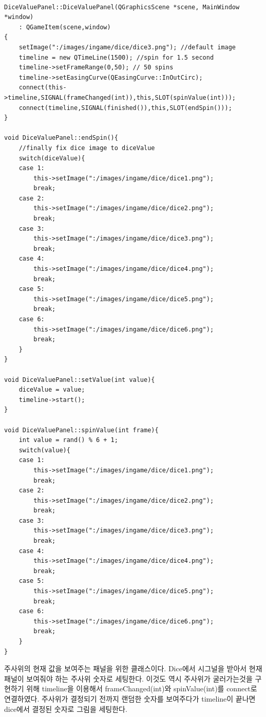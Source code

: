 \documentclass[10pt,oneside,a4paper,titlepage]{article}
\begin{document}
\begin{lstlisting}[frame=single,caption=
{DiceValuePanel},label=code:FD,captionpos=b,framexleftmargin=10pt,escapeinside=~~]

DiceValuePanel::DiceValuePanel(QGraphicsScene *scene, MainWindow *window)
    : QGameItem(scene,window)
{
    setImage(":/images/ingame/dice/dice3.png"); //default image
    timeline = new QTimeLine(1500); //spin for 1.5 second
    timeline->setFrameRange(0,50); // 50 spins
    timeline->setEasingCurve(QEasingCurve::InOutCirc);
    connect(this->timeline,SIGNAL(frameChanged(int)),this,SLOT(spinValue(int)));
    connect(timeline,SIGNAL(finished()),this,SLOT(endSpin()));
}

void DiceValuePanel::endSpin(){
    //finally fix dice image to diceValue
    switch(diceValue){
    case 1:
        this->setImage(":/images/ingame/dice/dice1.png");
        break;
    case 2:
        this->setImage(":/images/ingame/dice/dice2.png");
        break;
    case 3:
        this->setImage(":/images/ingame/dice/dice3.png");
        break;
    case 4:
        this->setImage(":/images/ingame/dice/dice4.png");
        break;
    case 5:
        this->setImage(":/images/ingame/dice/dice5.png");
        break;
    case 6:
        this->setImage(":/images/ingame/dice/dice6.png");
        break;
    }
}

void DiceValuePanel::setValue(int value){
    diceValue = value;
    timeline->start();
}

void DiceValuePanel::spinValue(int frame){
    int value = rand() % 6 + 1;
    switch(value){
    case 1:
        this->setImage(":/images/ingame/dice/dice1.png");
        break;
    case 2:
        this->setImage(":/images/ingame/dice/dice2.png");
        break;
    case 3:
        this->setImage(":/images/ingame/dice/dice3.png");
        break;
    case 4:
        this->setImage(":/images/ingame/dice/dice4.png");
        break;
    case 5:
        this->setImage(":/images/ingame/dice/dice5.png");
        break;
    case 6:
        this->setImage(":/images/ingame/dice/dice6.png");
        break;
    }
}

\end{lstlisting}

주사위의 현재 값을 보여주는 패널을 위한 클래스이다. Dice에서 시그널을 받아서 현재 패널이 보여줘야 하는 주사위 숫자로 세팅한다. 이것도 역시 주사위가 굴러가는것을 구현하기 위해 timeline을 이용해서 frameChanged(int)와 spinValue(int)를 connect로 연결하였다. 주사위가 결정되기 전까지 랜덤한 숫자를 보여주다가 timeline이 끝나면 dice에서 결정된 숫자로 그림을 세팅한다. 
\end{document}
